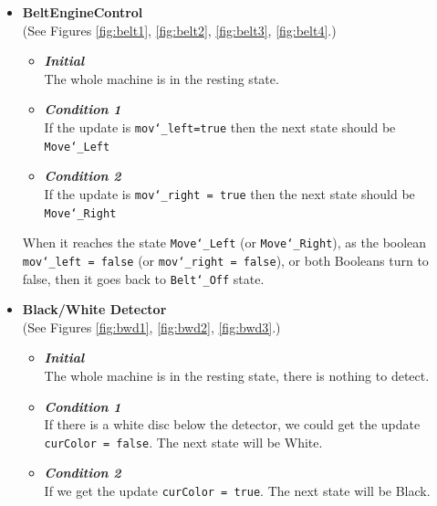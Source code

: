\documentclass[a4paper,oneside,11pt]{report}
\begin{document}
\begin{itemize}
\item \textbf{BeltEngineControl}\\
(See Figures \ref{fig:belt1}, \ref{fig:belt2}, \ref{fig:belt3}, \ref{fig:belt4}.)
\begin{itemize}
\item \textbf{\textit{Initial}}\\
The whole machine is in the resting state.
\item \textbf{\textit{Condition 1}}\\
If the update is \texttt{mov\char`_left=true} then the next state should be \texttt{Move\char`_Left}
\item \textbf{\textit{Condition 2}}\\
If the update is \texttt{mov\char`_right = true} then the next state should be \texttt{Move\char`_Right}
\end{itemize}
When it reaches the state \texttt{Move\char`_Left} (or \texttt{Move\char`_Right}), as the boolean \texttt{mov\char`_left = false} (or \texttt{mov\char`_right = false}), or both Booleans turn to false, then it goes back to \texttt{Belt\char`_Off} state.

\item \textbf{Black/White Detector}\\
(See Figures \ref{fig:bwd1}, \ref{fig:bwd2}, \ref{fig:bwd3}.)
\begin{itemize}
\item \textbf{\textit{Initial}}\\
The whole machine is in the resting state, there is nothing to detect.
\item \textbf{\textit{Condition 1}}\\
If there is a white disc below the detector, we could get the update \texttt{curColor = false}. The next state will be White.
\item \textbf{\textit{Condition 2}}\\
If we get the update \texttt{curColor = true}. The next state will be Black.
\end{itemize}


\end{itemize}
\end{document}
